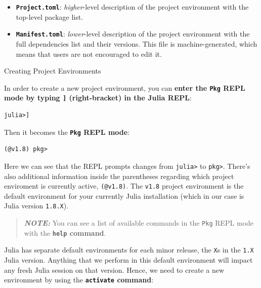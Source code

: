 \documentclass[
  notoc %
]{tufte-book}
\makeatletter
\providecommand{\tightlist}{%
  \setlength{\itemsep}{0pt}\setlength{\parskip}{0pt}
}
\newcommand{\passthrough}[1]{#1}
\renewcommand\subsubsection{%
\@startsection{subsubsection}{3}{\z@ }{-3.25ex\@plus -1ex \@minus -.2ex}{1.5ex \@plus .2ex}{\normalfont \normalsize \bfseries }
}
\makeatother
\begin{document}
\begin{itemize}
\tightlist
\item
  \textbf{\passthrough{\lstinline!Project.toml!}}: \emph{higher}-level
  description of the project environment with the top-level package
  list.
\item
  \textbf{\passthrough{\lstinline!Manifest.toml!}}: \emph{lower}-level
  description of the project environment with the full dependencies list
  and their versions. This file is machine-generated, which means that
  users are not encouraged to edit it.
\end{itemize}

\hypertarget{sec:project_management_creating}{%
\subsubsection{Creating Project
Environments}\label{sec:project_management_creating}}

In order to create a new project environment, you can \textbf{enter the
\passthrough{\lstinline!Pkg!} REPL mode by typing
\passthrough{\lstinline!]!} (right-bracket) in the Julia REPL}:

\begin{lstlisting}
julia>]
\end{lstlisting}

Then it becomes the \textbf{\passthrough{\lstinline!Pkg!} REPL mode}:

\begin{lstlisting}
(@v1.8) pkg>
\end{lstlisting}

Here we can see that the REPL prompts changes from
\passthrough{\lstinline!julia>!} to \passthrough{\lstinline!pkg>!}.
There's also additional information inside the parentheses regarding
which project enviroment is currently active,
\passthrough{\lstinline!(@v1.8)!}. The \passthrough{\lstinline!v1.8!}
project environment is the default environment for your currently Julia
installation (which in our case is Julia version
\passthrough{\lstinline!1.8.X!}).

\begin{quote}
\textbf{\emph{NOTE:}} You can see a list of available commands in the
\passthrough{\lstinline!Pkg!} REPL mode with the
\textbf{\passthrough{\lstinline!help!} command}.
\end{quote}

Julia has separate default environments for each minor release, the
\passthrough{\lstinline!X!}s in the \passthrough{\lstinline!1.X!} Julia
version. Anything that we perform in this default environment will
impact any fresh Julia session on that version. Hence, we need to create
a new environment by using the
\textbf{\passthrough{\lstinline!activate!} command}:
\end{document}
